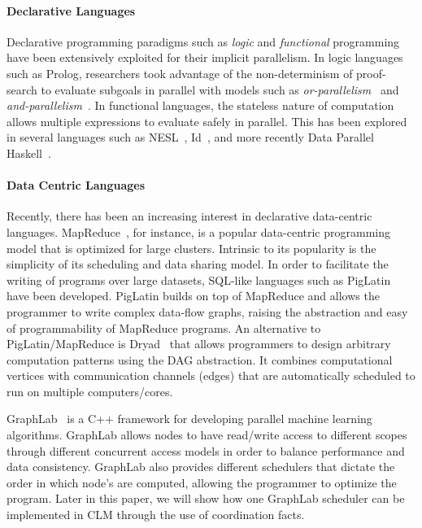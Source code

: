 
\paragraph{Declarative Languages}
Declarative programming paradigms such as \emph{logic} and \emph{functional}
programming have been extensively exploited for their implicit parallelism.
In logic languages such as Prolog, researchers took advantage of the
non-determinism of proof-search to evaluate subgoals in parallel with models
such as \emph{or-parallelism}~\cite{ali-86} and
\emph{and-parallelism}~\cite{Shen-92}.  In functional languages, the stateless
nature of computation allows multiple expressions to evaluate safely in
parallel. This has been explored in several languages such as
NESL~\cite{Blelloch:1996:PPA:227234.227246}, Id~\cite{Nikhil93anoverview}, and
more recently Data Parallel Haskell~\cite{nepal}.

\paragraph{Data Centric Languages}
Recently, there has been an increasing interest in declarative data-centric
languages.  MapReduce~\cite{Dean:2008:MSD:1327452.1327492}, for instance, is a
popular data-centric programming model that is optimized for large clusters.
Intrinsic to its popularity is the simplicity of its scheduling and data sharing
model.  In order to facilitate the writing of programs over large datasets,
SQL-like languages such as PigLatin~\cite{Olston:2008:PLN:1376616.1376726} have
been developed.  PigLatin builds on top of MapReduce and allows the programmer
to write complex data-flow graphs, raising the abstraction and easy of
programmability of MapReduce programs.  An alternative to PigLatin/MapReduce is
Dryad~\cite{Isard:2007:DDD:1272996.1273005} that allows programmers to design
arbitrary computation patterns using the DAG abstraction. It combines
computational vertices with communication channels (edges) that are
automatically scheduled to run on multiple computers/cores.

GraphLab~\cite{GraphLab2010} is a C++ framework for developing parallel machine
learning algorithms. GraphLab allows nodes to have read/write access to
different scopes through different concurrent access models in order to balance
performance and data consistency.  GraphLab also provides different schedulers
that dictate the order in which node's are computed, allowing the programmer to
optimize the program. Later in this paper, we will show how one GraphLab
scheduler can be implemented in CLM through the use of coordination facts.

